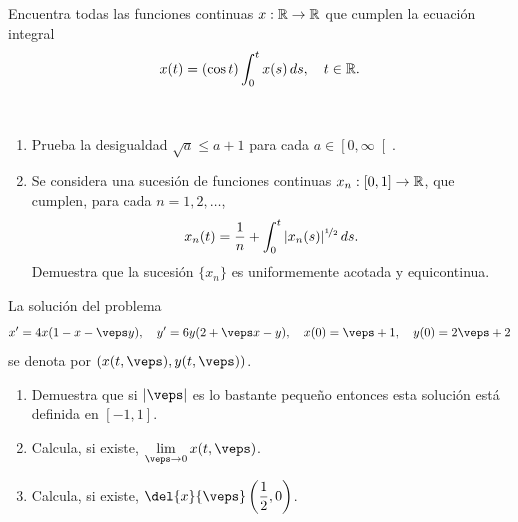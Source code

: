 \documentclass[12pt]{article}
\begin{document}
    \begin{ejercicio}
        Encuentra todas las funciones continuas $x : \mathbb{R} \to \mathbb{R}$ que cumplen la ecuación integral
        \[
        x(t) = (\cos t) \int_0^t x(s) \, ds, \quad t \in \mathbb{R}.
        \]
    \end{ejercicio}

    \begin{ejercicio}~
        \begin{enumerate}[label=\alph*)]
            \item Prueba la desigualdad $\sqrt{a} \leq a + 1$ para cada $a \in \left[0, \infty\right[$.
            \item Se considera una sucesión de funciones continuas $x_n : \left[0, 1\right] \to \mathbb{R}$, que cumplen, para cada $n = 1, 2, \dots$,
            \[
            x_n(t) = \frac{1}{n} + \int_0^t |x_n(s)|^{\nicefrac{1}{2}} \, ds.
            \]
            Demuestra que la sucesión $\{x_n\}$ es uniformemente acotada y equicontinua.
        \end{enumerate}
    \end{ejercicio}

    \begin{ejercicio}
        La solución del problema
        \[
        x' = 4x(1 - x - \veps y), \quad y' = 6y(2 + \veps x - y), \quad x(0) = \veps + 1, \quad y(0) = 2\veps + 2
        \]
        se denota por $(x(t, \veps), y(t, \veps))$.
        \begin{enumerate}[label=\alph*)]
            \item Demuestra que si $|\veps|$ es lo bastante pequeño entonces esta solución está definida en $\left[-1, 1\right]$.
            \item Calcula, si existe, $\lim\limits_{\veps \to 0} x(t, \veps)$.
            \item Calcula, si existe, $\displaystyle \del{x}{\veps}\left(\frac{1}{2}, 0\right)$.
        \end{enumerate}
    \end{ejercicio}

    \newpage
    \setcounter{ejercicio}{0} %
\end{document}
